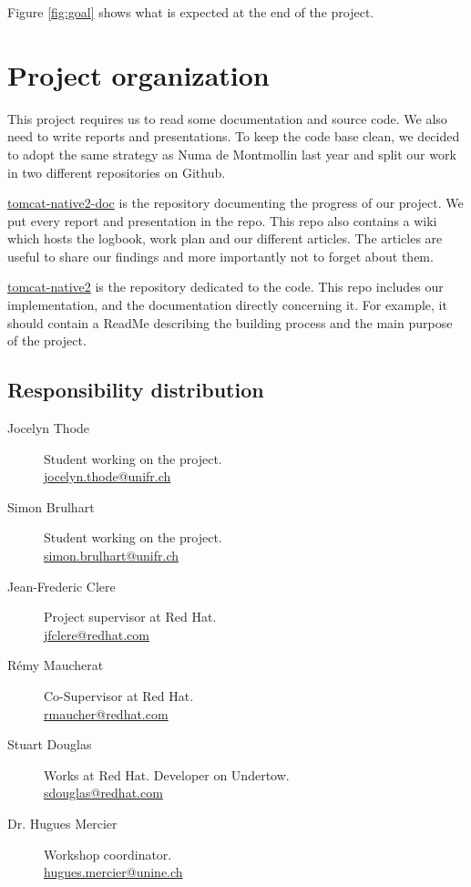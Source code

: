 \documentclass[11pt,a4paper,bibliography=totocnumbered]{scrartcl}
\def\theclient{Red Hat}
\begin{document}
Figure \ref{fig:goal} shows what is expected at the end of the project.

\section{Project organization}
\label{sec:org}

This project requires us to read some documentation and source code. We also need to write reports and presentations. To keep the code base clean, we decided to adopt the same strategy as Numa de Montmollin last year and split our work in two different repositories on Github.

\href{https://github.com/jocelynthode/tomcat-native2-doc}{tomcat-native2-doc} is the repository documenting the progress of our project. We put every report and presentation in the repo. This repo also contains a wiki which hosts the logbook, work plan and our different articles. The articles are useful to share our findings and more importantly not to forget about them.

\href{https://github.com/jocelynthode/tomcat-native2}{tomcat-native2} is the repository dedicated to the code. This repo includes our implementation, and the documentation directly concerning it. For example, it should contain a ReadMe describing the building process and the main purpose of the project.

\subsection{Responsibility distribution}

\begin{description}
\item[Jocelyn Thode] Student working on the project.\\
\href{mailto:jocelyn.thode@unifr.ch}{jocelyn.thode@unifr.ch}

\item[Simon Brulhart] Student working on the project.\\
\href{mailto:simon.brulhart@unifr.ch}{simon.brulhart@unifr.ch}

\item[Jean-Frederic Clere] Project supervisor at \theclient{}. \\
\href{mailto:jfclere@redhat.com}{jfclere@redhat.com}

\item[Rémy Maucherat] Co-Supervisor at \theclient{}.\\
\href{mailto:rmaucher@redhat.com}{rmaucher@redhat.com}

\item[Stuart Douglas] Works at \theclient{}.
Developer on Undertow.\\
\href{mailto:sdouglas@redhat.com}{sdouglas@redhat.com}

\item[Dr. Hugues Mercier] Workshop coordinator.\\
\href{mailto:hugues.mercier@unine.ch}{hugues.mercier@unine.ch}
\end{description}
\end{document}
